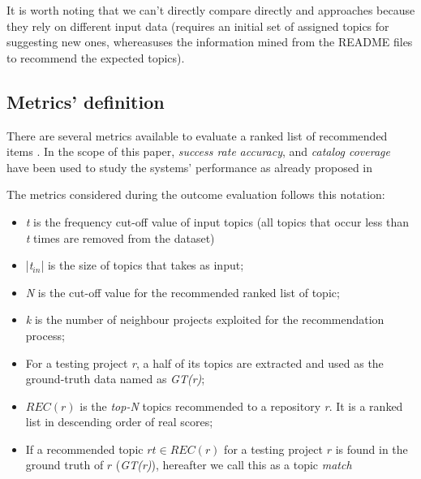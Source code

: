 It is worth noting that we can't directly compare directly \CT and \MNB approaches because they rely on different input data (\ie \CT requires an initial set of assigned topics for suggesting new ones, whereas\MNB uses the information mined from the README files to recommend the expected topics). 


\subsection{Metrics' definition}\label{sec:metrics}

There are several metrics available to evaluate a ranked list of recommended items \cite{DBLP:conf/rweb/NoiaO15}. In the scope of this paper, \emph{success rate} \emph{accuracy}, and \emph{catalog coverage} have been used to study the systems' performance as already proposed in \etal~\cite{Robillard:2014:RSS:2631387}



 The metrics considered during the outcome evaluation follows this notation:

\begin{itemize}[noitemsep,topsep=0pt]
	\item \emph{t} is the frequency cut-off value of input topics (\ie all topics that occur less than \emph{t} times are removed from the dataset)
	\item |\emph{t$_{in}$}| is the size of topics that \CT takes as input;
	\item \emph{N} is the cut-off value for the recommended ranked list of topic;%
	\item \emph{k} is the number of neighbour projects exploited for the recommendation process;
	\item For a testing project \emph{r}, a half of its topics are extracted and used as the ground-truth data named as \emph{GT(r)};
	\item $REC(r)$ is the \emph{top-N} topics recommended to a repository \emph{r}. It is a ranked list in descending order of real scores;
	\item If a recommended topic $rt \in REC(r)$ for a testing project $r$ is found in the ground truth of $r$ (\ie \emph{GT(r)}), hereafter we call this as a topic \textit{match}
\end{itemize}



